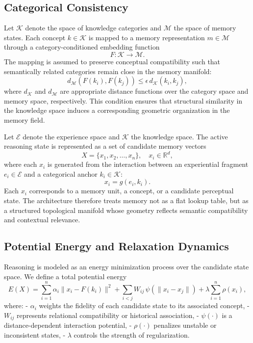 \documentclass[10pt,journal,compsoc]{IEEEtran}
\begin{document}
\subsection{Categorical Consistency}

Let $\mathcal{K}$ denote the space of knowledge categories and $\mathcal{M}$ the space of memory states. Each concept $k \in \mathcal{K}$ is mapped to a memory representation $m \in \mathcal{M}$ through a category-conditioned embedding function
\[
F : \mathcal{K} \rightarrow \mathcal{M}.
\]
The mapping is assumed to preserve conceptual compatibility such that semantically related categories remain close in the memory manifold:
\[
d_{\mathcal{M}}(F(k_i), F(k_j)) \leq \epsilon \, d_{\mathcal{K}}(k_i, k_j),
\]
where $d_{\mathcal{K}}$ and $d_{\mathcal{M}}$ are appropriate distance functions over the category space and memory space, respectively. This condition ensures that structural similarity in the knowledge space induces a corresponding geometric organization in the memory field.

Let $\mathcal{E}$ denote the experience space and $\mathcal{K}$ the knowledge space. The active reasoning state is represented as a set of candidate memory vectors
\[
X = \{x_1, x_2, \ldots, x_n\}, \quad x_i \in \mathbb{R}^d,
\]
where each $x_i$ is generated from the interaction between an experiential fragment $e_i \in \mathcal{E}$ and a categorical anchor $k_i \in \mathcal{K}$:
\[
x_i = g(e_i, k_i).
\]
Each $x_i$ corresponds to a memory unit, a concept, or a candidate perceptual state. The architecture therefore treats memory not as a flat lookup table, but as a structured topological manifold whose geometry reflects semantic compatibility and contextual relevance.

\subsection{Potential Energy and Relaxation Dynamics}

Reasoning is modeled as an energy minimization process over the candidate state space. We define a total potential energy
\[
E(X) =
\sum_{i=1}^{n} \alpha_i \|x_i - F(k_i)\|^2
+ \sum_{i<j} W_{ij}\,\psi(\|x_i - x_j\|)
+ \lambda \sum_{i=1}^{n} \rho(x_i),
\]
where:
- $\alpha_i$ weights the fidelity of each candidate state to its associated concept,
- $W_{ij}$ represents relational compatibility or historical association,
- $\psi(\cdot)$ is a distance-dependent interaction potential,
- $\rho(\cdot)$ penalizes unstable or inconsistent states,
- $\lambda$ controls the strength of regularization.
\end{document}
